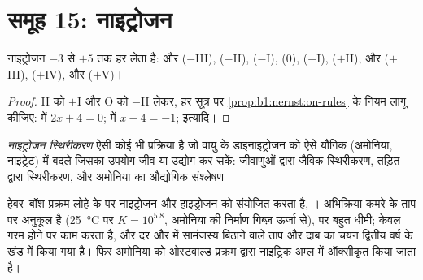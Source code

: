 \section{समूह 15: नाइट्रोजन}

\begin{proposition}[नाइट्रोजन की सीढ़ी]\label{prop:b1:p-block-13-15:nitrogen-ladder}
नाइट्रोजन $-3$ से $+5$ तक हर  लेता है:  और
 ($-$III),  ($-$II),  ($-$I),  (0),
 ($+$I),  ($+$II),  और  ($+$III),
 ($+$IV),  और  ($+$V)।
\end{proposition}

\begin{proof}
H को $+$I और O को $-$II लेकर, हर सूत्र पर \cref{prop:b1:nernst:on-rules} के नियम
लागू कीजिए:  में $2x + 4 = 0$;  में $x - 4 =
-1$; इत्यादि।
\end{proof}

\begin{definition}[नाइट्रोजन स्थिरीकरण]\label{def:b1:p-block-13-15:nitrogen-fixation}
\emph{नाइट्रोजन स्थिरीकरण} ऐसी कोई भी प्रक्रिया है जो
वायु के डाइनाइट्रोजन को ऐसे यौगिक (अमोनिया, नाइट्रेट) में बदले
जिसका उपयोग जीव या उद्योग कर सकें: जीवाणुओं द्वारा जैविक स्थिरीकरण,
तड़ित द्वारा स्थिरीकरण, और अमोनिया का औद्योगिक संश्लेषण।
\end{definition}

हेबर--बॉश प्रक्रम लोहे के  पर नाइट्रोजन और हाइड्रोजन को संयोजित करता है,
। अभिक्रिया कमरे के
ताप पर अनुकूल है (\qty{25}{\celsius} पर $K = 10^{5.8}$, अमोनिया की निर्माण गिब्ज़ ऊर्जा
से), पर बहुत धीमी;  केवल गरम होने पर काम करता है, और
दर और  में सामंजस्य बिठाने वाले ताप और दाब का चयन
द्वितीय वर्ष के खंड में किया गया है। फिर अमोनिया को ओस्टवाल्ड प्रक्रम द्वारा
नाइट्रिक अम्ल में ऑक्सीकृत किया जाता है।


